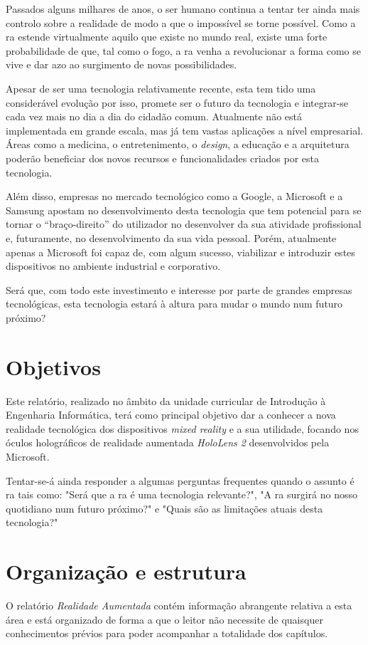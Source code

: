 \documentclass{report}
\begin{document}
Passados alguns milhares de anos, o ser humano continua a tentar ter ainda mais controlo sobre a realidade de modo a que o impossível se torne possível. Como a \ac{ra} estende virtualmente aquilo que existe no mundo real, existe uma forte probabilidade de que, tal como o fogo, a \ac{ra} venha a revolucionar a forma como se vive e dar azo ao surgimento de novas possibilidades.

Apesar de ser uma tecnologia relativamente recente, esta tem tido uma considerável evolução por isso, promete ser o futuro da tecnologia e integrar-se cada vez mais no dia a dia do cidadão comum. Atualmente não está implementada em grande escala, mas já tem vastas aplicações a nível empresarial. Áreas como a medicina, o entretenimento, o \textit{design}, a educação e a arquitetura poderão beneficiar dos novos recursos e funcionalidades criados por esta tecnologia.

Além disso, empresas no mercado tecnológico como a Google, a Microsoft e a Samsung apostam no desenvolvimento desta tecnologia que tem potencial para se tornar o “braço-direito” do utilizador no desenvolver da sua atividade profissional e, futuramente, no desenvolvimento da sua vida pessoal. Porém, atualmente apenas a Microsoft foi capaz de, com algum sucesso, viabilizar e introduzir estes dispositivos no ambiente industrial e corporativo.

Será que, com todo este investimento e interesse por parte de grandes empresas tecnológicas, esta tecnologia estará à altura para mudar o mundo num futuro próximo?

\section{Objetivos}
Este relatório, realizado no âmbito da unidade curricular de Introdução à Engenharia Informática, terá como principal objetivo dar a conhecer a nova realidade tecnológica dos dispositivos \textit{mixed reality} e a sua utilidade, focando nos óculos holográficos de realidade aumentada \textit{HoloLens 2} desenvolvidos pela Microsoft.

Tentar-se-á ainda responder a algumas perguntas frequentes quando o assunto é \ac{ra} tais como: "Será que a \ac{ra} é uma tecnologia relevante?", "A \ac{ra} surgirá no nosso quotidiano num futuro próximo?" e "Quais são as limitações atuais desta tecnologia?"

\section{Organização e estrutura}
O relatório \textit{Realidade Aumentada} contém informação abrangente relativa a esta área e está organizado de forma a que o leitor não necessite de quaisquer conhecimentos prévios para poder acompanhar a totalidade dos capítulos.
\end{document}
